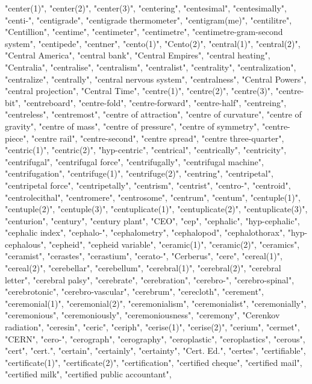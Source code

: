 "center(1)",
"center(2)",
"center(3)",
"centering",
"centesimal",
"centesimally",
"centi-",
"centigrade",
"centigrade thermometer",
"centigram(me)",
"centilitre",
"Centillion",
"centime",
"centimeter",
"centimetre",
"centimetre-gram-second system",
"centipede",
"centner",
"cento(1)",
"Cento(2)",
"central(1)",
"central(2)",
"Central America",
"central bank",
"Central Empires",
"central heating",
"Centralia",
"centralise",
"centralism",
"centralist",
"centrality",
"centralization",
"centralize",
"centrally",
"central nervous system",
"centralness",
"Central Powers",
"central projection",
"Central Time",
"centre(1)",
"centre(2)",
"centre(3)",
"centre-bit",
"centreboard",
"centre-fold",
"centre-forward",
"centre-half",
"centreing",
"centreless",
"centremost",
"centre of attraction",
"centre of curvature",
"centre of gravity",
"centre of mass",
"centre of pressure",
"centre of symmetry",
"centre-piece",
"centre rail",
"centre-second",
"centre spread",
"centre three-quarter",
"centric(1)",
"centric(2)",
"hyp-centric",
"centrical",
"centrically",
"centricity",
"centrifugal",
"centrifugal force",
"centrifugally",
"centrifugal machine",
"centrifugation",
"centrifuge(1)",
"centrifuge(2)",
"centring",
"centripetal",
"centripetal force",
"centripetally",
"centrism",
"centrist",
"centro-",
"centroid",
"centrolecithal",
"centromere",
"centrosome",
"centrum",
"centum",
"centuple(1)",
"centuple(2)",
"centuple(3)",
"centuplicate(1)",
"centuplicate(2)",
"centuplicate(3)",
"centurion",
"century",
"century plant",
"CEO",
"cep",
"cephalic",
"hyp-cephalic",
"cephalic index",
"cephalo-",
"cephalometry",
"cephalopod",
"cephalothorax",
"hyp-cephalous",
"cepheid",
"cepheid variable",
"ceramic(1)",
"ceramic(2)",
"ceramics",
"ceramist",
"cerastes",
"cerastium",
"cerato-",
"Cerberus",
"cere",
"cereal(1)",
"cereal(2)",
"cerebellar",
"cerebellum",
"cerebral(1)",
"cerebral(2)",
"cerebral letter",
"cerebral palsy",
"cerebrate",
"cerebration",
"cerebro-",
"cerebro-spinal",
"cerebrotonic",
"cerebro-vascular",
"cerebrum",
"cerecloth",
"cerement",
"ceremonial(1)",
"ceremonial(2)",
"ceremonialism",
"ceremonialist",
"ceremonially",
"ceremonious",
"ceremoniously",
"ceremoniousness",
"ceremony",
"Cerenkov radiation",
"ceresin",
"ceric",
"ceriph",
"cerise(1)",
"cerise(2)",
"cerium",
"cermet",
"CERN",
"cero-",
"cerograph",
"cerography",
"ceroplastic",
"ceroplastics",
"cerous",
"cert",
"cert.",
"certain",
"certainly",
"certainty",
"Cert. Ed.",
"certes",
"certifiable",
"certificate(1)",
"certificate(2)",
"certification",
"certified cheque",
"certified mail",
"certified milk",
"certified public accountant",
